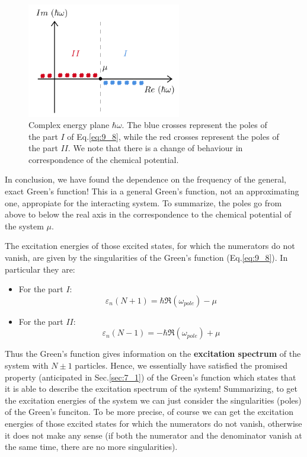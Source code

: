 \documentclass[../main/main.tex]{subfiles}
\begin{document}
\begin{figure}[h!]
\centering
\includegraphics[width=0.6\textwidth]{../lessons/9_image/2.pdf}
\caption{\label{fig:9_2} Complex energy plane \( \hbar \omega  \). The blue crosses represent the poles of the part \( I  \) of Eq.\eqref{eq:9_8}, while the red crosses represent the poles of the part \( II \). We note that there is a change of behaviour in correspondence of the chemical potential.}
\end{figure}

In conclusion, we have found the dependence on the frequency of the general, exact Green's function! This ia a general Green's function, not an approximating one, appropiate for the interacting system.
To summarize, the poles go from above to below the real axis in the correspondence to the chemical potential of the system \( \mu  \).

The excitation energies of those excited states, for which the numerators do not vanish, are given by the singularities of the Green's function (Eq.\eqref{eq:9_8}). In particular they are:
\begin{itemize}
\item For the part \( I \):
\begin{equation}
  \varepsilon _n (N+1) = \hbar \Re (\omega _{pole}) - \mu
\end{equation}
\item For the part \( II \):
\begin{equation}
  \varepsilon _n (N-1) = -\hbar \Re (\omega _{pole}) + \mu
\end{equation}
\end{itemize}
Thus the Green's function gives information on the \textbf{excitation spectrum} of the system with \( N\pm1 \) particles.
Hence, we essentially have satisfied the promised property (anticipated in Sec.\ref{sec:7_1}) of the Green's function which states that it is able to describe the excitation spectrum of the system! Summarizing, to get the excitation energies of the system we can just consider the singularities (poles) of the Green's funciton.
To be more precise, of course we can get the excitation energies of those excited states for which the numerators do not vanish, otherwise it does not make any sense (if both the numerator and the denominator vanish at the same time, there are no more singularities).
\end{document}
